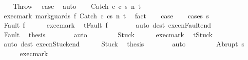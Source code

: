 \begin{isabellebody}
\isanewline
{}\isamarkupfalse%
\isanewline
\ \ \isamarkupfalse%
\ Throw\ \isamarkupfalse%
\ {\isacharquery}case\ \isamarkupfalse%
\ auto\isanewline
{}\isamarkupfalse%
\isanewline
\ \ \isamarkupfalse%
\ {\isacharparenleft}Catch\ c{}\ c{}\ s\ n\ t{\isacharparenright}\isanewline
\ \ \isamarkupfalse%
\ exec{\isacharunderscore}mark{\isacharcolon}\ {\isachardoublequoteopen}{\isasymGamma}{\isasymturnstile}{\isasymlangle}mark{\isacharunderscore}guards\ f\ {\isacharparenleft}Catch\ c{}\ c{}{\isacharparenright}{\isacharcomma}s{\isasymrangle}\ {\isacharequal}n{\isasymRightarrow}\ t{\isachardoublequoteclose}\ \isamarkupfalse%
\ fact\isanewline
\ \ \isamarkupfalse%
\ {\isacharquery}case\isanewline
\ \ \isamarkupfalse%
\ {\isacharparenleft}cases\ {\isachardoublequoteopen}s{\isachardoublequoteclose}{\isacharparenright}\isanewline
\ \ \ \ \isamarkupfalse%
\ {\isacharparenleft}Fault\ f{\isacharparenright}\isanewline
\ \ \ \ \isamarkupfalse%
\ exec{\isacharunderscore}mark\ \isamarkupfalse%
\ {\isachardoublequoteopen}t{\isacharequal}Fault\ f{\isachardoublequoteclose}\isanewline
\ \ \ \ \ \ \isamarkupfalse%
\ {\isacharparenleft}auto\ dest{\isacharcolon}\ execn{\isacharunderscore}Fault{\isacharunderscore}end{\isacharparenright}\isanewline
\ \ \ \ \isamarkupfalse%
\ Fault\ \isamarkupfalse%
\ {\isacharquery}thesis\isanewline
\ \ \ \ \ \ \isamarkupfalse%
\ auto\isanewline
\ \ \isamarkupfalse%
\isanewline
\ \ \ \ \isamarkupfalse%
\ Stuck\isanewline
\ \ \ \ \isamarkupfalse%
\ exec{\isacharunderscore}mark\ \isamarkupfalse%
\ {\isachardoublequoteopen}t{\isacharequal}Stuck{\isachardoublequoteclose}\isanewline
\ \ \ \ \ \ \isamarkupfalse%
\ {\isacharparenleft}auto\ dest{\isacharcolon}\ execn{\isacharunderscore}Stuck{\isacharunderscore}end{\isacharparenright}\isanewline
\ \ \ \ \isamarkupfalse%
\ Stuck\ \isamarkupfalse%
\ {\isacharquery}thesis\isanewline
\ \ \ \ \ \ \isamarkupfalse%
\ auto\isanewline
\ \ \isamarkupfalse%
\isanewline
\ \ \ \ \isamarkupfalse%
\ {\isacharparenleft}Abrupt\ s{\isacharprime}{\isacharparenright}\isanewline
\ \ \ \ \isamarkupfalse%
\ exec{\isacharunderscore}mark\ \isamarkupfalse%

\end{isabellebody}
